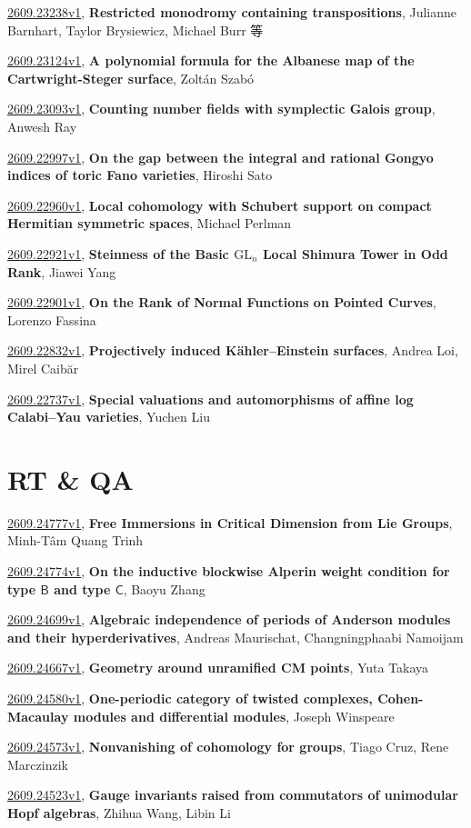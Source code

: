 \documentclass[9pt, a4paper]{article}
\theoremstyle{plain}
\theoremstyle{definition}
\theoremstyle{remark}
\newcommand{\arxiv}[3]{\href{https://arxiv.org/abs/#1}{#1}, \textbf{\textcolor{arxivblue}{#2}}, #3}
\begin{document}
\arxiv{2609.23238v1}{Restricted monodromy containing transpositions}{Julianne Barnhart, Taylor Brysiewicz, Michael Burr 等}

\arxiv{2609.23124v1}{A polynomial formula for the Albanese map of the Cartwright-Steger surface}{Zoltán Szabó}

\arxiv{2609.23093v1}{Counting number fields with symplectic Galois group}{Anwesh Ray}

\arxiv{2609.22997v1}{On the gap between the integral and rational Gongyo indices of toric Fano varieties}{Hiroshi Sato}

\arxiv{2609.22960v1}{Local cohomology with Schubert support on compact Hermitian symmetric spaces}{Michael Perlman}

\arxiv{2609.22921v1}{Steinness of the Basic $\mathrm{GL}_n$ Local Shimura Tower in Odd Rank}{Jiawei Yang}

\arxiv{2609.22901v1}{On the Rank of Normal Functions on Pointed Curves}{Lorenzo Fassina}

\arxiv{2609.22832v1}{Projectively induced Kähler--Einstein surfaces}{Andrea Loi, Mirel Caibăr}

\arxiv{2609.22737v1}{Special valuations and automorphisms of affine log Calabi--Yau varieties}{Yuchen Liu}


\section{RT \& QA}
\arxiv{2609.24777v1}{Free Immersions in Critical Dimension from Lie Groups}{Minh-Tâm Quang Trinh}

\arxiv{2609.24774v1}{On the inductive blockwise Alperin weight condition for type $\mathsf B$ and type $\mathsf C$}{Baoyu Zhang}

\arxiv{2609.24699v1}{Algebraic independence of periods of Anderson modules and their hyperderivatives}{Andreas Maurischat, Changningphaabi Namoijam}

\arxiv{2609.24667v1}{Geometry around unramified CM points}{Yuta Takaya}

\arxiv{2609.24580v1}{One-periodic category of twisted complexes, Cohen-Macaulay modules and differential modules}{Joseph Winspeare}

\arxiv{2609.24573v1}{Nonvanishing of cohomology for groups}{Tiago Cruz, Rene Marczinzik}

\arxiv{2609.24523v1}{Gauge invariants raised from commutators of unimodular Hopf algebras}{Zhihua Wang, Libin Li}
\end{document}
